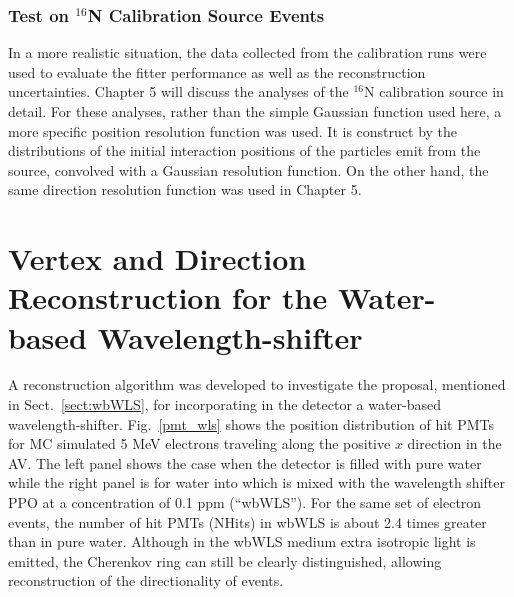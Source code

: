 \subsubsection{Test on $^{16}$N Calibration Source Events}

In a more realistic situation, the data collected from the calibration runs were used to evaluate the fitter performance as well as the reconstruction uncertainties. Chapter 5 will discuss the analyses of the $^{16}$N calibration source in detail. For these analyses, rather than the simple Gaussian function used here, a more specific position resolution function was used. It is construct by the distributions of the initial interaction positions of the particles emit from the source, convolved with a Gaussian resolution function. On the other hand, the same direction resolution function was used in Chapter 5. 

\section{Vertex and Direction Reconstruction for the Water-based Wavelength-shifter}\label{sect:WLSfitter}

A reconstruction algorithm was developed to investigate the proposal, mentioned in Sect.~\ref{sect:wbWLS}, for incorporating in the detector a water-based wavelength-shifter. Fig.~\ref{pmt_wls} shows the position distribution of hit PMTs for MC simulated 5 MeV electrons traveling along the positive $x$ direction in the AV. The left panel shows the case when the detector is filled with pure water while the right panel is for water into which is mixed with the wavelength shifter PPO at a concentration of 0.1 ppm (``wbWLS''). For the same set of electron events, the number of hit PMTs (NHits) in wbWLS is about 2.4 times greater than in pure water. Although in the wbWLS medium extra isotropic light is emitted, the Cherenkov ring can still be clearly distinguished, allowing reconstruction of the directionality of events.

